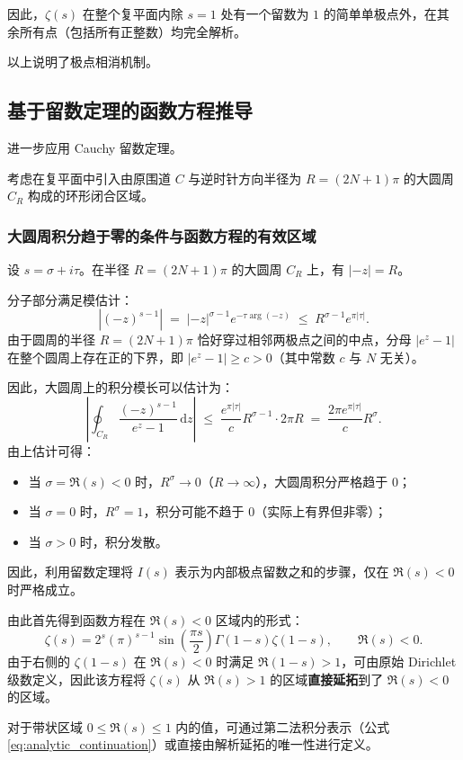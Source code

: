 因此，$\zeta(s)$ 在整个复平面内除 $s=1$ 处有一个留数为 $1$ 的简单单极点外，在其余所有点（包括所有正整数）均完全解析。

以上说明了极点相消机制。

\subsection{基于留数定理的函数方程推导}

进一步应用 Cauchy 留数定理。

考虑在复平面中引入由原围道 $C$ 与逆时针方向半径为 $R=(2N+1)\pi$ 的大圆周 $C_R$ 构成的环形闭合区域。

\subsubsection*{大圆周积分趋于零的条件与函数方程的有效区域}

设 $s=\sigma+i\tau$。在半径 $R=(2N+1)\pi$ 的大圆周 $C_R$ 上，有 $|-z| = R$。

分子部分满足模估计：
\[
  |(-z)^{s-1}| \;=\; |-z|^{\sigma-1} e^{-\tau \arg(-z)} \;\le\; R^{\sigma-1} e^{\pi |\tau|}.
\]
由于圆周的半径 $R = (2N+1)\pi$ 恰好穿过相邻两极点之间的中点，分母 $|e^z-1|$ 在整个圆周上存在正的下界，即 $|e^z-1| \ge c > 0$（其中常数 $c$ 与 $N$ 无关）。

因此，大圆周上的积分模长可以估计为：
\[
  \left| \oint_{C_R} \frac{(-z)^{s-1}}{e^z - 1} \,\mathrm{d}z \right| \;\le\; \frac{e^{\pi |\tau|}}{c} R^{\sigma-1} \cdot 2\pi R \;=\; \frac{2\pi e^{\pi |\tau|}}{c} R^{\sigma}.
\]
由上估计可得：
\begin{itemize}
  \item 当 $\sigma = \Re(s) < 0$ 时，$R^{\sigma} \to 0$（$R\to\infty$），大圆周积分严格趋于 $0$；
  \item 当 $\sigma = 0$ 时，$R^{\sigma} = 1$，积分可能不趋于 $0$（实际上有界但非零）；
  \item 当 $\sigma > 0$ 时，积分发散。
\end{itemize}

因此，利用留数定理将 $I(s)$ 表示为内部极点留数之和的步骤，仅在 $\Re(s)<0$ 时严格成立。

由此首先得到函数方程在 $\Re(s)<0$ 区域内的形式：
\[
\zeta(s) = 2^s(\pi)^{s-1}\sin\left(\frac{\pi s}{2}\right)\Gamma(1-s)\zeta(1-s),\qquad \Re(s)<0.
\]
由于右侧的 $\zeta(1-s)$ 在 $\Re(s)<0$ 时满足 $\Re(1-s)>1$，可由原始 Dirichlet 级数定义，因此该方程将 $\zeta(s)$ 从 $\Re(s)>1$ 的区域\textbf{直接延拓}到了 $\Re(s)<0$ 的区域。

对于带状区域 $0\le\Re(s)\le 1$ 内的值，可通过第二法积分表示（公式 \eqref{eq:analytic_continuation}）或直接由解析延拓的唯一性进行定义。

